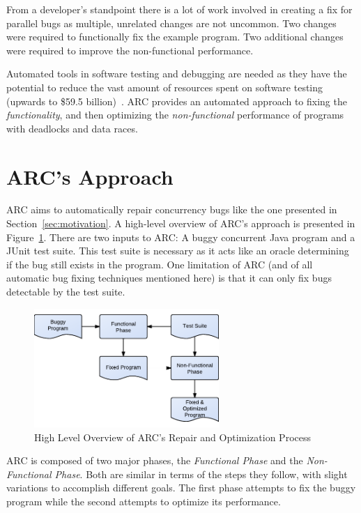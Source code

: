 \documentclass[10pt, conference, compsocconf]{IEEEtran}
\begin{document}
From a developer's standpoint there is a lot of work involved in creating a fix for parallel bugs as multiple, unrelated changes are not uncommon. Two changes  were required to functionally fix the example program. Two additional changes were required to improve the non-functional performance.

Automated tools in software testing and debugging are needed as they have the potential to reduce the vast amount of resources spent on software testing (upwards to \$59.5 billion)~\cite{RTI02}. ARC provides an automated approach to fixing the \textit{functionality}, and then optimizing the \textit{non-functional} performance of programs with deadlocks and data races.

\section{ARC's Approach}
\label{sec:approach}

ARC aims to automatically repair concurrency bugs like the one
presented in Section~\ref{sec:motivation}. A high-level overview of ARC's
approach is presented in Figure~\ref{fig:process}. There are two inputs to ARC: A buggy concurrent Java program and a JUnit test suite. This
test suite is necessary as it acts like an oracle determining if the bug
still exists in the program. One limitation of ARC (and of all automatic bug
fixing techniques mentioned here) is that it can only fix bugs detectable by 
the test suite.

\begin{figure}[!h]
  \centering
  \includegraphics[width=7.0cm]{figures/process.pdf}
  \caption{High Level Overview of ARC's Repair and Optimization Process}
  \label{fig:process}
\end{figure}

ARC is composed of two major phases, the \textit{Functional Phase} and the
\textit{Non-Functional Phase}. Both are similar in terms of the steps
they follow, with slight variations to accomplish different goals. The first phase attempts to fix the buggy program while the second attempts to optimize its performance. 
\end{document}
